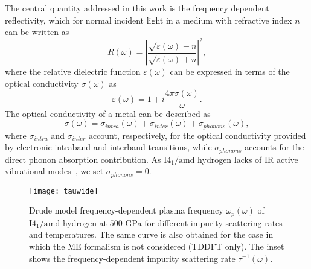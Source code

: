\documentclass[11pt,titlepage,a4paper,twoside]{article}
\begin{document}
The central quantity addressed in this work is the frequency dependent reflectivity,
which for normal incident light in a medium with refractive index $n$ can be written as 
\begin{equation}\label{reflec}
 R(\omega)=\left|\frac{\sqrt{\varepsilon(\omega)}-n}{\sqrt{\varepsilon(\omega)}+n}\right|^2,
\end{equation}
where the relative dielectric function $\varepsilon(\omega)$ can be expressed in terms of the 
optical conductivity $\sigma(\omega)$ as
\begin{equation}\label{eq:dielectric}
 \varepsilon(\omega)=1+i\frac{4\pi\sigma(\omega)}{\omega}.
\end{equation}
The optical conductivity of a metal can be described as 
\begin{equation}
\sigma(\omega)=\sigma_{intra}(\omega)+\sigma_{inter}(\omega)+\sigma_{phonons}(\omega),
\label{opcond}
\end{equation}
where $\sigma_{intra}$ and $\sigma_{inter}$ account, respectively,
for the optical conductivity provided by electronic intraband and interband
transitions, while $\sigma_{phonons}$ accounts for the direct phonon
absorption contribution.
As $\mathrm{I4_1/amd}$ hydrogen lacks of IR active vibrational 
modes~\cite{PhysRevB.93.174308}, we set 
$\sigma_{phonons}=0.$ 

\begin{figure}[t]
 \texttt{[image: tauwide]}\hspace{0.1cm}
 \caption{\label{tauwide} Drude model frequency-dependent plasma frequency $\omega_p(\omega)$ of $\mathrm{I4_1/amd}$ hydrogen at $500$ GPa for different impurity scattering rates and temperatures. The same curve is also obtained for the case in which the ME formalism is
 not considered (TDDFT only). The inset shows the frequency-dependent impurity scattering rate $\tau^{-1}(\omega)$.
}
\end{figure}
\end{document}

